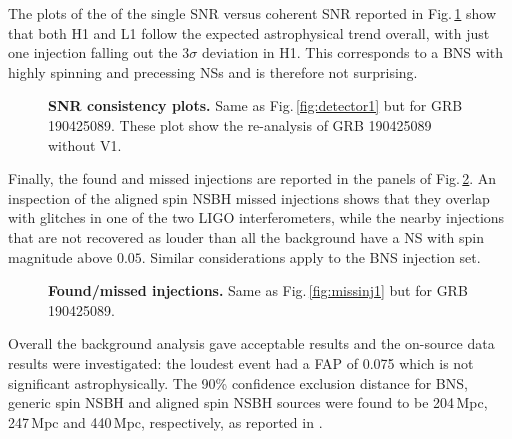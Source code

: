 \documentclass[binding=0.6cm, LaM]{sapthesis}
\begin{document}
	The plots of the of the single SNR versus coherent SNR reported in Fig.\,\ref{fig:detector3_final} show that both H1 and L1
	follow the expected astrophysical trend overall, with just one injection falling out the 3$\sigma$ deviation in H1.  This corresponds to a BNS with highly spinning and precessing NSs and is therefore not surprising.
        \begin{figure}[!t]
          \noindent
          \label{detector3_final}
          \centering
          \caption{\textbf{SNR consistency plots.} Same as Fig.\,\ref{fig:detector1} but for GRB 190425089. These plot show the re-analysis of GRB 190425089 without V1.}
          \label{fig:detector3_final}
        \end{figure}
	
        Finally, the found and missed injections are reported in the panels of Fig.\,\ref{fig:missinj3_5}.  An inspection of the aligned spin NSBH missed injections shows that they overlap with glitches in one of the two LIGO interferometers, while the nearby injections that are not recovered as louder than all the background have a NS with spin magnitude above $0.05$.
        Similar considerations apply to the BNS injection set.
        \begin{figure}[!t]
          \noindent
          \label{missinj3_5}
          \centering
          \caption{\textbf{Found/missed injections.} Same as Fig.\,\ref{fig:missinj1} but for GRB 190425089.}
          \label{fig:missinj3_5}
        \end{figure}
	Overall the background analysis gave acceptable results
	and the on-source data results were investigated: 
	the loudest event had a FAP of 0.075 which is not significant astrophysically.  The 90\% confidence exclusion distance for BNS, generic spin NSBH and aligned spin NSBH sources were found to be 204\,Mpc, 247\,Mpc and 440\,Mpc, respectively, as reported in \cite{43}.
\end{document}
